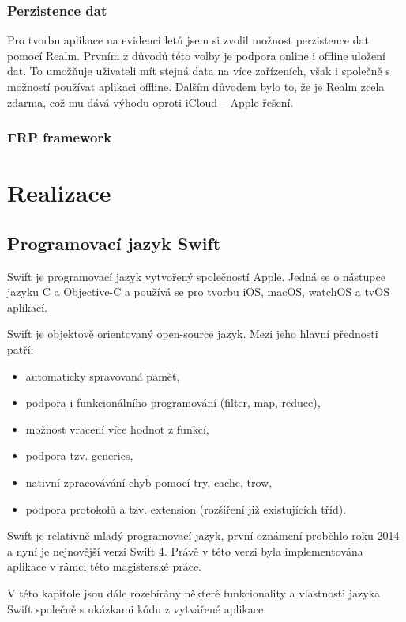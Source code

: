 \documentclass[thesis=M,czech]{FITthesis}[2012/06/26]
\begin{document}
\subsection{Perzistence dat}
Pro tvorbu aplikace na evidenci letů jsem si zvolil možnost perzistence dat pomocí Realm. Prvním z důvodů této volby je podpora online i offline uložení dat. To umožňuje uživateli mít stejná data na více zařízeních, však i společně s možností používat aplikaci offline. Dalším důvodem bylo to, že je Realm zcela zdarma, což mu dává výhodu oproti iCloud -- Apple řešení.

\subsection{FRP framework}


\chapter{Realizace}
\label{chap:realizace}

\section{Programovací jazyk Swift}
Swift je programovací jazyk vytvořený společností Apple. Jedná se o nástupce jazyku C a Objective-C a používá se pro tvorbu iOS, macOS, watchOS a tvOS aplikací.

Swift je objektově orientovaný open-source jazyk. Mezi jeho hlavní přednosti patří: 
\begin{itemize}
\item automaticky spravovaná paměť,
\item podpora i funkcionálního programování (filter, map, reduce),
\item možnost vracení  více  hodnot z funkcí,
\item podpora tzv. generics,
\item nativní zpracovávání chyb pomocí try, cache, trow,
\item podpora protokolů a tzv. extension (rozšíření již existujících tříd). \cite{swift}
\end{itemize}

Swift je relativně mladý programovací jazyk, první oznámení proběhlo roku 2014 a nyní je nejnovější verzí Swift 4. Právě v této verzi byla implementována aplikace v rámci této magisterské práce. \cite{swift2}

V této kapitole jsou dále rozebírány některé funkcionality a vlastnosti jazyka Swift společně s ukázkami kódu z vytvářené aplikace.
\end{document}
